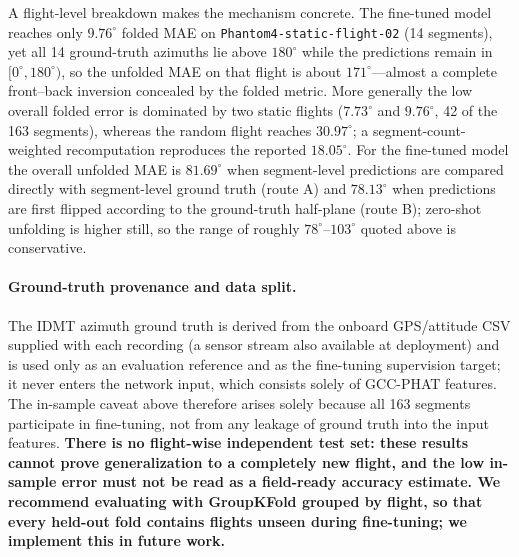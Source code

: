 \documentclass[5p,twocolumn]{elsarticle}
\begin{document}
A flight-level breakdown makes the mechanism concrete. The fine-tuned model reaches only $9.76^\circ$ folded MAE on \texttt{Phantom4-static-flight-02} (14 segments), yet all 14 ground-truth azimuths lie above $180^\circ$ while the predictions remain in $[0^\circ,180^\circ)$, so the unfolded MAE on that flight is about $171^\circ$---almost a complete front--back inversion concealed by the folded metric. More generally the low overall folded error is dominated by two static flights ($7.73^\circ$ and $9.76^\circ$, 42 of the 163 segments), whereas the random flight reaches $30.97^\circ$; a segment-count-weighted recomputation reproduces the reported $18.05^\circ$. For the fine-tuned model the overall unfolded MAE is $81.69^\circ$ when segment-level predictions are compared directly with segment-level ground truth (route A) and $78.13^\circ$ when predictions are first flipped according to the ground-truth half-plane (route B); zero-shot unfolding is higher still, so the range of roughly $78^\circ$--$103^\circ$ quoted above is conservative.
\paragraph{Ground-truth provenance and data split.}
The IDMT azimuth ground truth is derived from the onboard GPS/attitude CSV supplied with each recording (a sensor stream also available at deployment) and is used only as an evaluation reference and as the fine-tuning supervision target; it never enters the network input, which consists solely of GCC-PHAT features. The in-sample caveat above therefore arises solely because all 163 segments participate in fine-tuning, not from any leakage of ground truth into the input features. \textbf{There is no flight-wise independent test set: these results cannot prove generalization to a completely new flight, and the low in-sample error must not be read as a field-ready accuracy estimate. We recommend evaluating with GroupKFold grouped by flight, so that every held-out fold contains flights unseen during fine-tuning; we implement this in future work.}
\end{document}
